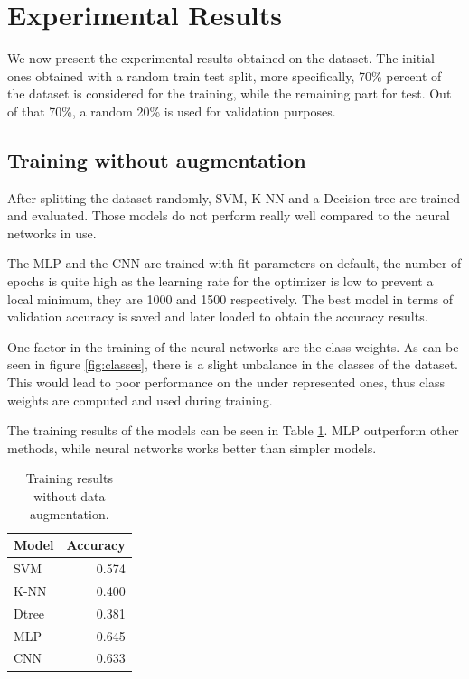 \section{Experimental Results}

We now present the experimental results obtained on the dataset. 
The initial ones obtained with a random train test split, more specifically, 
70\% percent of the dataset is considered for the training, while the remaining part
for test. 
Out of that 70\%, a random 20\% is used for validation purposes.

\subsection{Training without augmentation}

After splitting the dataset randomly, SVM, K-NN and a Decision tree are trained and evaluated.
Those models do not perform really well compared to the neural networks in use.

The MLP and the CNN are trained with fit parameters on default, the number of epochs is quite high as
the learning rate for the optimizer is low to prevent a local minimum, they are 
1000 and 1500 respectively. The best model in terms of validation accuracy is saved 
and later loaded to obtain the accuracy results.

One factor in the training of the neural networks are the class weights. As can be seen 
in figure \ref{fig:classes}, there is a slight unbalance in the classes of the 
dataset. This would lead to poor performance on the under represented ones, thus 
class weights are computed and used during training.

The training results of the models can be seen in Table \ref{tab:res1}. 
MLP outperform other methods, while neural networks works better than simpler models.

\begin{table}
    \begin{center}
        \begin{tabular}{ |l|r| } 
        \hline
        Model & Accuracy \\
        \hline
        SVM   & 0.574 \\
        K-NN   & 0.400 \\
        Dtree & 0.381 \\
        MLP   & 0.645 \\
        CNN   & 0.633 \\
        \hline
        \end{tabular}
    \end{center}
    \caption{Training results without data augmentation.} \label{tab:res1}
\end{table}

